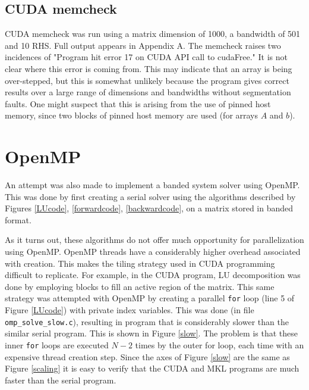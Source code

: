 \documentclass[12pt]{article}
\begin{document}
\subsection{CUDA memcheck}

CUDA memcheck was run using a matrix dimension of 1000, a
bandwidth of 501 and 10 RHS. Full output appears in Appendix A. The
memcheck raises two incidences of "Program hit error 17 on CUDA API call to
cudaFree." It is not clear where this error is coming from. This may
indicate that an array is being over-stepped, but this is somewhat unlikely
because the program gives correct results over a large range of dimensions and
bandwidths without segmentation faults. One might suspect that this is arising from the use of pinned host
memory, since two blocks of pinned host memory are used (for arrays $A$ and
$b$).

\section{OpenMP}
\label{sec:omp}

An attempt was also made to implement a banded system solver using OpenMP. This
was done by first creating a serial solver using the algorithms described by
Figures \ref{LUcode}, \ref{forwardcode}, \ref{backwardcode}, on a matrix
stored in banded format.

As it turns out, these algorithms do not offer much opportunity for
parallelization using OpenMP. OpenMP threads have a considerably higher
overhead associated with creation. This makes the tiling  strategy used in CUDA
programming difficult to replicate.  For example, in the CUDA program, LU
decomposition was done by employing blocks to fill an active region of the
matrix. This same strategy was attempted with OpenMP by creating a parallel
\texttt{for} loop (line 5 of Figure \ref{LUcode}) with private index variables.
This was done (in file \texttt{omp\_solve\_slow.c}), resulting in program that
is considerably slower than the similar serial program.  This is shown in
Figure \ref{slow}.  The problem is that these inner \texttt{for} loops are executed $N-2$
times by the outer for loop, each time with an expensive thread creation step.
Since the axes of Figure \ref{slow} are the same as Figure \ref{scaling} it is easy to
verify that the CUDA and MKL programs are much faster than the serial program.
\end{document}
